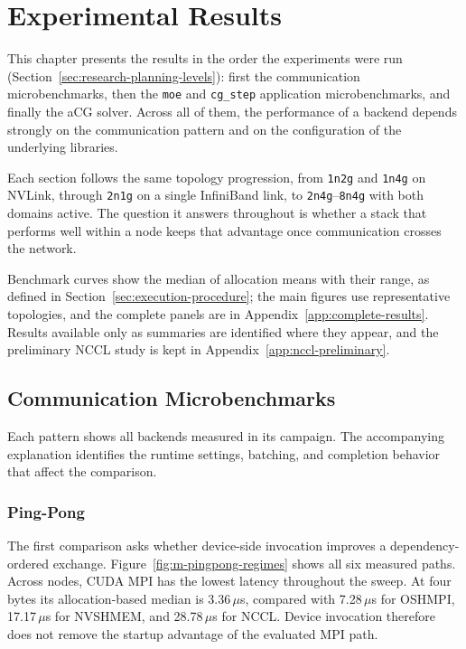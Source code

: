 \chapter{Experimental Results}\label{ch:m-results}

This chapter presents the results in the order the experiments were run (Section~\ref{sec:research-planning-levels}): first the communication microbenchmarks, then the \texttt{moe} and \texttt{cg\_step} application microbenchmarks, and finally the aCG solver. Across all of them, the performance of a backend depends strongly on the communication pattern and on the configuration of the underlying libraries.

Each section follows the same topology progression, from \texttt{1n2g} and \texttt{1n4g} on NVLink, through \texttt{2n1g} on a single InfiniBand link, to \texttt{2n4g}--\texttt{8n4g} with both domains active. The question it answers throughout is whether a stack that performs well within a node keeps that advantage once communication crosses the network.

Benchmark curves show the median of allocation means with their range, as defined in Section~\ref{sec:execution-procedure}; the main figures use representative topologies, and the complete panels are in Appendix~\ref{app:complete-results}. Results available only as summaries are identified where they appear, and the preliminary NCCL study is kept in Appendix~\ref{app:nccl-preliminary}.

\section{Communication Microbenchmarks}\label{sec:micro-results}

Each pattern shows all backends measured in its campaign. The accompanying explanation identifies the runtime settings, batching, and completion behavior that affect the comparison.

\subsection{Ping-Pong}

The first comparison asks whether device-side invocation improves a dependency-ordered exchange. Figure~\ref{fig:m-pingpong-regimes} shows all six measured paths. Across nodes, CUDA MPI has the lowest latency throughout the sweep. At four bytes its allocation-based median is 3.36\,$\mu$s, compared with 7.28\,$\mu$s for OSHMPI, 17.17\,$\mu$s for NVSHMEM, and 28.78\,$\mu$s for NCCL. Device invocation therefore does not remove the startup advantage of the evaluated MPI path.


